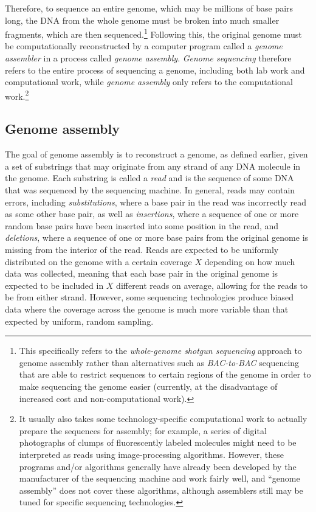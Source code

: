 \documentclass[10pt]{article}
\newcommand{\KeyTerm}[1]{{\it #1}}
\begin{document}
Therefore, to sequence an entire genome, which may be millions of base pairs
long, the DNA from the whole genome must be broken into much smaller fragments,
which are then sequenced.\footnote{This specifically refers to the
\KeyTerm{whole-genome shotgun sequencing} approach to genome assembly rather
than alternatives such as \KeyTerm{BAC-to-BAC} sequencing that are able to
restrict sequences to certain regions of the genome in order to make sequencing
the genome easier (currently, at the disadvantage of increased cost and
non-computational work).} Following this, the original genome must be
computationally reconstructed by a computer program called a \KeyTerm{genome
assembler} in a process called \KeyTerm{genome assembly}.  \KeyTerm{Genome
sequencing} therefore refers to the entire process of sequencing a genome,
including both lab work and computational work, while \KeyTerm{genome assembly}
only refers to the computational work.\footnote{It usually also takes some
technology-specific computational work to actually prepare the sequences for
assembly; for example, a series of digital photographs of clumps of
fluorescently labeled molecules might need to be interpreted as reads using
image-processing algorithms.  However, these programs and/or algorithms
generally have already been developed by the manufacturer of the sequencing
machine and work fairly well, and ``genome assembly'' does not cover these
algorithms, although assemblers still may be tuned for specific sequencing
technologies.}

\subsection{Genome assembly}

\label{subsec:reads}

The goal of genome assembly is to reconstruct a genome, as defined earlier,
given a set of substrings that may originate from any strand of any DNA molecule
in the genome.  Each substring is called a \KeyTerm{read} and is the sequence of
some DNA that was sequenced by the sequencing machine.  In general, reads may
contain errors, including \KeyTerm{substitutions}, where a base pair in the read
was incorrectly read as some other base pair, as well as \KeyTerm{insertions},
where a sequence of one or more random base pairs have been inserted into some
position in the read, and \KeyTerm{deletions}, where a sequence of one or more
base pairs from the original genome is missing from the interior of the read.
Reads are expected to be uniformly distributed on the genome with a certain
coverage $X$ depending on how much data was collected, meaning that each base
pair in the original genome is expected to be included in $X$ different reads on
average, allowing for the reads to be from either strand.  However, some
sequencing technologies produce biased data where the coverage across the genome
is much more variable than that expected by uniform, random sampling.
\end{document}
